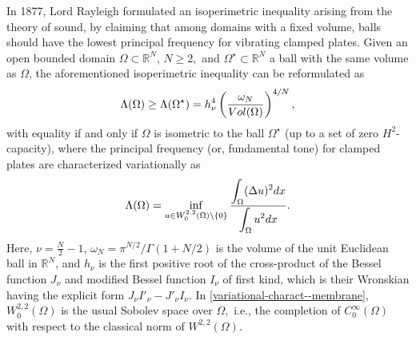 \documentclass[11pt, reqno]{amsart}
\numberwithin{equation}{section}
\begin{document}
	In 1877, Lord Rayleigh \cite[p.\ 382]{Rayleigh} formulated  an isoperimetric inequality   arising from the theory of sound, by claiming that among domains with a fixed volume, balls should have the lowest principal frequency for  vibrating clamped plates. Given an open bounded domain $\Omega\subset \mathbb R^N$, $N\geq 2,$ and $\Omega^\star\subset \mathbb R^N$ a ball with the same volume as $\Omega$, the aforementioned isoperimetric inequality can be reformulated as  
	\begin{equation}\label{cp-conjecture}
			\Lambda(\Omega)\geq \Lambda(\Omega^\star)= h^4_{\nu}\left(\frac{\omega_N}{{\rm Vol}(\Omega)}\right)^{4/N},
	\end{equation}
with equality if and only if $\Omega$ is isometric to the ball $\Omega^\star$ (up to a set of zero $H^2$-capacity), 
	where the principal frequency (or, fundamental tone) for clamped plates are characterized variationally as  
	\begin{equation}\label{variational-charact--membrane}
		\Lambda(\Omega)=\inf_{u\in W_0^{2,2}(\Omega)\setminus \{0\}}\frac{\displaystyle \int_{\Omega}(\Delta u)^2 {\rm d}x}{\displaystyle \int_{\Omega}u^2 {\rm d}x}.
	\end{equation} 
   Here,  $\nu=\frac{N}{2}-1$, $\omega_N=\pi^{N/2}/\Gamma(1+N/2)$  is the volume of the unit Euclidean ball in $\mathbb R^N$, and $ h_\nu$ is the first positive root of the cross-product of the Bessel function $J_\nu$ and modified Bessel function $I_\nu$
   of first kind, which is their Wronskian  having the explicit form $J_\nu I'_\nu-J'_\nu I_\nu$. 
   In \eqref{variational-charact--membrane},   $W_0^{2,2}(\Omega)$ is the usual Sobolev space over $\Omega,$ i.e., the completion of $C_0^\infty(\Omega)$ with respect to the classical norm of $W^{2,2}(\Omega)$. 
	
\end{document}
